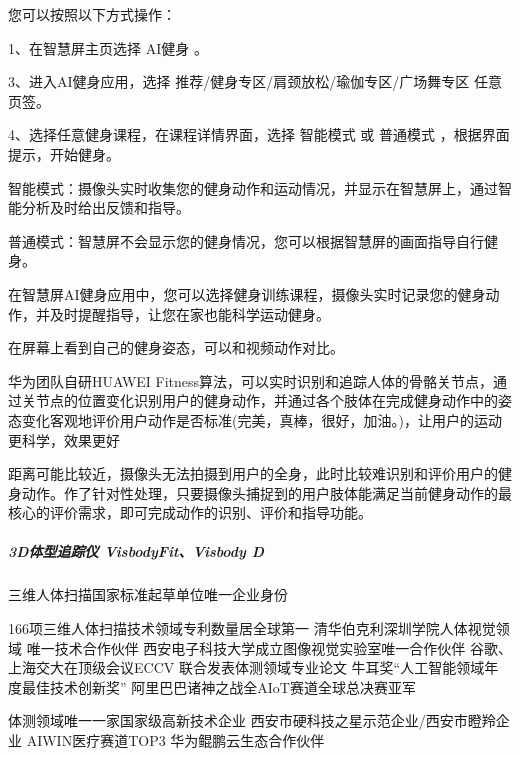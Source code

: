\documentclass[letterpaper,10pt,english]{sphinxmanual}
\begin{document}
您可以按照以下方式操作：

1、在智慧屏主页选择 AI健身 。

3、进入AI健身应用，选择 推荐/健身专区/肩颈放松/瑜伽专区/广场舞专区
任意页签。

4、选择任意健身课程，在课程详情界面，选择 智能模式 或 普通模式
，根据界面提示，开始健身。

智能模式：摄像头实时收集您的健身动作和运动情况，并显示在智慧屏上，通过智能分析及时给出反馈和指导。

普通模式：智慧屏不会显示您的健身情况，您可以根据智慧屏的画面指导自行健身。

在智慧屏AI健身应用中，您可以选择健身训练课程，摄像头实时记录您的健身动作，并及时提醒指导，让您在家也能科学运动健身。

在屏幕上看到自己的健身姿态，可以和视频动作对比。

华为团队自研HUAWEI
Fitness算法，可以实时识别和追踪人体的骨骼关节点，通过关节点的位置变化识别用户的健身动作，并通过各个肢体在完成健身动作中的姿态变化客观地评价用户动作是否标准(完美，真棒，很好，加油。)，让用户的运动更科学，效果更好

距离可能比较近，摄像头无法拍摄到用户的全身，此时比较难识别和评价用户的健身动作。作了针对性处理，只要摄像头捕捉到的用户肢体能满足当前健身动作的最核心的评价需求，即可完成动作的识别、评价和指导功能。


\subparagraph{3D体型追踪仪 VisbodyFit、Visbody D}
\label{\detokenize{chapter_project/AI_fit:d-visbodyfitvisbody-d}}
三维人体扫描国家标准起草单位唯一企业身份
%
\begin{footnote}[761]\sphinxAtStartFootnote
{}
%
\end{footnote}
166项三维人体扫描技术领域专利数量居全球第一
清华\sphinxhyphen{}伯克利深圳学院人体视觉领域 唯一技术合作伙伴
西安电子科技大学成立图像视觉实验室唯一合作伙伴
谷歌、上海交大在顶级会议ECCV 联合发表体测领域专业论文
牛耳奖“人工智能领域年度最佳技术创新奖”
阿里巴巴诸神之战全AIoT赛道全球总决赛亚军%
\begin{footnote}[762]\sphinxAtStartFootnote
{}
%
\end{footnote}
体测领域唯一一家国家级高新技术企业
西安市硬科技之星示范企业/西安市瞪羚企业 AIWIN医疗赛道TOP3
华为鲲鹏云生态合作伙伴
\end{document}
